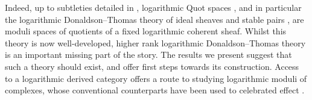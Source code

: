 \documentclass[11pt]{amsart}
\theoremstyle{definition}
\theoremstyle{definition}
\begin{document}


Indeed, up to subtleties detailed in \cite{Kennedy-Hunt-Poiret-Song:Log-Vector-bundle}, logarithmic Quot spaces \cite{kennedy2023logarithmic,maulik2024logarithmic}, and in particular the logarithmic Donaldson--Thomas theory of ideal sheaves and stable pairs \cite{maulik2024logarithmic,maulik2025logarithmic, maulik2026logarithmic}, are moduli spaces of quotients of a fixed logarithmic coherent sheaf. 
Whilst this theory is now well-developed, 
higher rank logarithmic Donaldson--Thomas theory is an important missing part of the story. 
The results we present suggest that such a theory should exist, and offer first steps towards its construction. 
Access to a logarithmic derived category offers a route to studying logarithmic moduli of complexes, whose conventional counterparts have been used to celebrated effect \cite{feyzbakhsh2023rank,feyzbakhsh2023curve,feyzbakhsh2024rank}.

\end{document}
